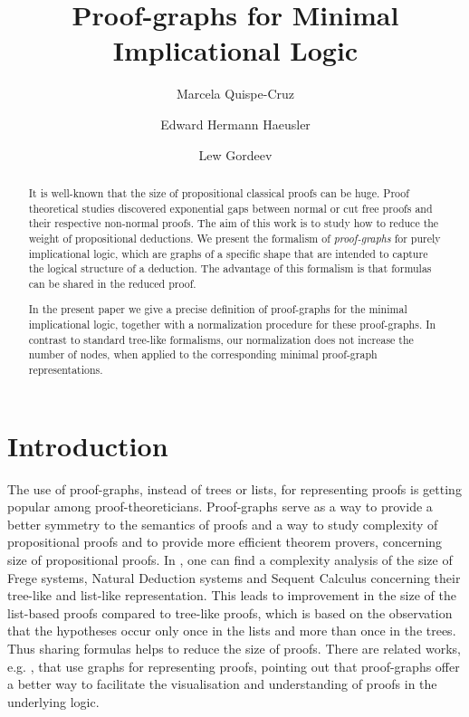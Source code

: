 \documentclass[submission,copyright,creativecommons]{eptcs}
\title{Proof-graphs for Minimal Implicational Logic}
\author{Marcela Quispe-Cruz \institute{Inform\'atica PUC-Rio, Rio de Janeiro, Brazil}
\and Edward Hermann Haeusler \institute{Inform\'atica PUC-Rio, Rio de Janeiro, Brazil}
\and Lew Gordeev \institute{T\"{u}bingen\medskip\ University, Ghent University, PUC-Rio}
}
\begin{document}
\maketitle

\begin{abstract} 
It is well-known that the size of propositional classical proofs can  be huge. 
Proof theoretical studies discovered exponential gaps between  normal or cut free 
proofs and their respective non-normal proofs. The  aim of this work is to study 
how to reduce the weight of propositional deductions. We present the formalism of 
\emph{proof-graphs} for purely implicational logic, which are graphs of a specific shape that are  intended to capture the logical structure of a deduction. 
The advantage of this formalism is that formulas can be shared in the reduced proof.

In the present paper we give a precise definition of proof-graphs for the  minimal
implicational logic, together with a normalization procedure for  these proof-graphs. 
In contrast to standard tree-like formalisms, our normalization does not increase the 
number of nodes, when applied to the corresponding minimal proof-graph representations. 
\end{abstract}

\section{Introduction}

The use of proof-graphs, instead of trees or lists, for representing proofs is getting popular among 
proof-theoreticians. Proof-graphs serve as a way to provide a better symmetry to the 
semantics of proofs \cite{deOliveira2003} and a way to study 
complexity of propositional proofs and to provide more efficient theorem 
provers, concerning size of propositional proofs. In \cite{BonetB1993}, 
one can find a complexity analysis of the size of Frege systems, 
Natural Deduction systems and Sequent Calculus concerning their tree-like and 
list-like representation. This leads to 
improvement in the size of the list-based proofs compared to tree-like proofs, 
which is based on the observation that the hypotheses occur only
once in the lists and more than once in the trees. Thus sharing formulas helps 
to reduce the size of proofs. There are related works, e.g. \cite{Alves2011}, 
that use graphs for representing proofs, pointing out that proof-graphs offer 
a better way to facilitate the visualisation and understanding of proofs in 
the underlying logic.
\end{document}
